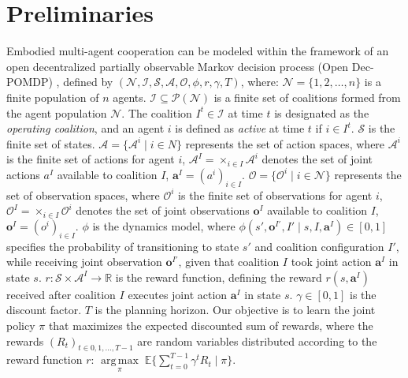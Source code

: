 \documentclass[11pt]{article}
\begin{document}
%

%

%

\section{Preliminaries}
\label{sec:preliminaries}
%
Embodied multi-agent cooperation can be modeled within the framework of an open decentralized partially observable Markov decision process (Open Dec-POMDP) \cite{cohen2017open}, defined by $( \mathcal{N}, \mathcal{I}, \mathcal{S}, \mathcal{A}, \mathcal{O}, \phi, r, \gamma, T )$, where: $\mathcal{N} = \{1, 2, \ldots, n\}$ is a finite population of $n$ agents. $\mathcal{I} \subseteq \mathcal{P}(\mathcal{N})$ is a finite set of coalitions formed from the agent population $\mathcal{N}$. The coalition $I^t \in \mathcal{I}$ at time $t$ is designated as the \textit{operating coalition}, and an agent $i$ is defined as \textit{active} at time $t$ if $i \in I^t$. $\mathcal{S}$ is the finite set of states. $\mathcal{A} = \{\mathcal{A}^i \mid i \in N\}$ represents the set of action spaces, where $\mathcal{A}^i$ is the finite set of actions for agent $i$, $\mathcal{A}^I = \times_{i \in I} \mathcal{A}^i$ denotes the set of joint actions $a^I$ available to coalition $I$, $\boldsymbol{a}^I = (a^i)_{i \in I}$. $\mathcal{O} = \{\mathcal{O}^i \mid i \in \mathcal{N}\}$ represents the set of observation spaces, where $\mathcal{O}^i$ is the finite set of observations for agent $i$, $\mathcal{O}^I = \times_{i \in I} \mathcal{O}^i$ denotes the set of joint observations $\boldsymbol{o}^I$ available to coalition $I$, $\boldsymbol{o}^I = (o^i)_{i \in I}$. $\phi$ is the dynamics model, where $\phi(s', \boldsymbol{o}^{I'}, I' \mid s, I, \boldsymbol{a}^I) \in [0, 1]$ specifies the probability of transitioning to state $s'$ and coalition configuration $I'$, while receiving joint observation $\boldsymbol{o}^{I'}$, given that coalition $I$ took joint action $\boldsymbol{a}^I$ in state $s$. $r: \mathcal{S} \times \mathcal{A}^I \to \mathbb{R}$ is the reward function, defining the reward $r(s, \boldsymbol{a}^I)$ received after coalition $I$ executes joint action $\boldsymbol{a}^I$ in state $s$. $\gamma \in [0, 1]$ is the discount factor. $T$ is the planning horizon. Our objective is to learn the joint policy $\pi$ that maximizes the expected discounted sum of rewards, where the rewards $(R_t)_{t \in {0, 1, \dots, T-1}}$ are random variables distributed according to the reward function $r$: $\underset{\pi}{\operatorname{arg\,max}} \; \mathbb{E} \{ \sum_{t=0}^{T-1} \gamma^t R_t \mid \pi \}$.
\end{document}
